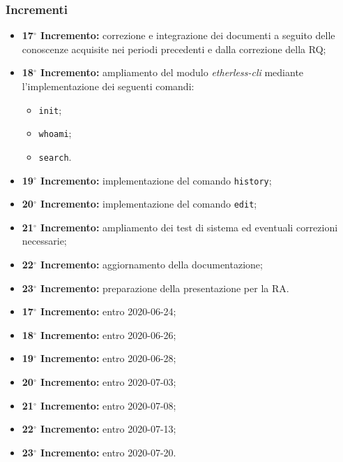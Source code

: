 	\subsubsection{Incrementi}
			\begin{itemize}
				\item \textbf{17$^{\circ}$ Incremento:} correzione e integrazione dei documenti a seguito delle conoscenze acquisite nei periodi precedenti e dalla correzione della RQ;
				\item \textbf{18$^{\circ}$ Incremento:} ampliamento del modulo \textit{etherless-cli} mediante l'implementazione dei seguenti comandi:
					\begin{itemize}
						\item \texttt{init};
						\item \texttt{whoami};
						\item \texttt{search}.
					\end{itemize}
				\item \textbf{19$^{\circ}$ Incremento:} implementazione del comando \texttt{history};
				\item \textbf{20$^{\circ}$ Incremento:} implementazione del comando \texttt{edit};
				\item \textbf{21$^{\circ}$ Incremento:} ampliamento dei test di sistema ed eventuali correzioni necessarie;
				\item \textbf{22$^{\circ}$ Incremento:} aggiornamento della documentazione;
				\item \textbf{23$^{\circ}$ Incremento:} preparazione della presentazione per la RA.
			\end{itemize}
			\begin{itemize}
				\item \textbf{17$^{\circ}$ Incremento:} entro 2020-06-24;
				\item \textbf{18$^{\circ}$ Incremento:} entro 2020-06-26;
				\item \textbf{19$^{\circ}$ Incremento:} entro 2020-06-28;
				\item \textbf{20$^{\circ}$ Incremento:} entro 2020-07-03;
				\item \textbf{21$^{\circ}$ Incremento:} entro 2020-07-08;
				\item \textbf{22$^{\circ}$ Incremento:} entro 2020-07-13;
				\item \textbf{23$^{\circ}$ Incremento:} entro 2020-07-20.
			\end{itemize}

